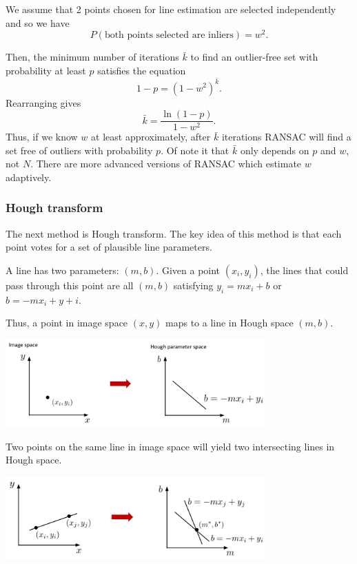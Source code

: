\documentclass[twoside]{article}
\begin{document}
We assume that 2 points chosen for line estimation are selected independently and so we have 
$$P(\text{both points selected are inliers}) = w^2.$$

Then, the minimum number of iterations $\bar{k}$ to find an outlier-free set with probability at least $p$ satisfies the equation  
$$ 1-p = (1-w^2)^{\bar{k}}.$$
Rearranging gives $$\bar{k} = \frac{\ln(1-p)}{1-w^2}.$$
Thus, if we know $w$ at least approximately, after $\bar{k}$ iterations RANSAC will find a set free of outliers with probability $p$. Of note it that $\bar{k}$ only depends on $p$ and $w$, not $N$. There are more advanced versions of RANSAC which estimate $w$ adaptively.

\subsubsection{Hough transform}
The next method is Hough transform. The key idea of this method is that each point votes for a set of plausible line parameters. 

A line has two parameters: $(m,b)$. Given a point $(x_i,y_i)$, the lines that could pass through this point are all $(m,b)$ satisfying $y_i=mx_i+b$ or $b=-mx_i+y+i$.

Thus, a point in image space $(x,y)$ maps to a line in Hough space $(m,b)$.

\begin{center}
	\includegraphics[width=0.75\textwidth]{hough1}
\end{center}

Two points on the same line in image space will yield two intersecting lines in Hough space.

\begin{center}
	\includegraphics[width=0.75\textwidth]{hough2}
\end{center}
\end{document}
